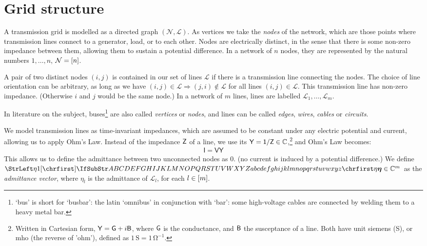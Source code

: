 \documentclass[main.tex]{subfiles}
\begin{document}
\section{Grid structure}
A transmission grid is modelled as a directed graph $(\mathcal{N},\mathcal{L})$. As vertices we take the \emph{nodes} of the network, which are those points where transmission lines connect to a generator, load, or to each other. Nodes are electrically distinct, in the sense that there is some non-zero impedance between them, allowing them to sustain a potential difference. In a network of $n$ nodes, they are represented by the natural numbers $1,\dots,n$, \ie $\mathcal{N}=[n]$.

A pair of two distinct nodes $(i,j)$ is contained in our set of lines $\mathcal{L}$ if there is a transmission line connecting the nodes. The choice of line orientation can be arbitrary, as long as we have $(i,j) \in \mathcal{L} \Rightarrow (j,i) \notin \mathcal{L}$ for all lines $(i,j) \in \mathcal{L}$. This transmission line has non-zero impedance. (Otherwise $i$ and $j$ would be the same node.) In a network of $m$ lines, lines are labelled $\mathcal{L}_1, \dots, \mathcal{L}_m$. 

In literature on the subject, buses\footnote{`bus' is short for `busbar': the latin `omnibus' in conjunction with `bar': some high-voltage cables are connected by welding them to a heavy metal bar.} are also called \emph{vertices} or \emph{nodes}, and lines can be called \emph{edges}, \emph{wires}, \emph{cables} or \emph{circuits}.

We model transmission lines as time-invariant impedances, which are assumed to be constant under any electric potential and current, allowing us to apply Ohm's Law. Instead of the impedance $\mathsf{Z}$ of a line, we use its  $\mathsf{Y=1/Z} \in \mathbb{C}$,\footnote{Written in Cartesian form, $\mathsf{Y=G}+i\mathsf{B}$, where $\mathsf{G}$ is the conductance, and $\mathsf{B}$ the susceptance of a line. Both have unit siemens (S), or mho (the reverse of 'ohm'), defined as $1 \,\si{\siemens}=1\,\si{\ohm}^{-1}$. }
 and Ohm's Law becomes:
\begin{align*}
    \mathsf{I=VY}
\end{align*}
This allows us to define the admittance between two unconnected nodes as $0$. (\ie no current is induced by a potential difference.) We define $\mat{\eta} \in \mathbb{C}^m$ as the \emph{admittance vector}, where $\eta_l$ is the admittance of $\mathcal{L}_l$, for each $l \in [m]$. 
\end{document}
